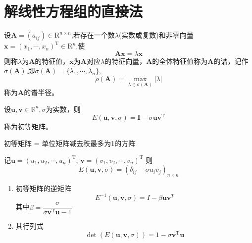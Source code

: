 \section{解线性方程组的直接法}
\begin{definition}[特征值和谱半径]
    设$\boldsymbol{A}=(a_{ij})\in \mathrm{R}^{n\times n}$,若存在一个数$\lambda$(实数或复数)和非零向量$\boldsymbol{x}=(x_1,\cdots,x_n)^{\mathrm{T}}\in \mathrm{R}^n$,使
    \[
        \boldsymbol{Ax}=\lambda \boldsymbol{x}
    \]
    则称$\lambda$为$\boldsymbol{A}$的特征值，$\boldsymbol{x}$为$\boldsymbol{A}$对应$\lambda$的特征向量，$\boldsymbol{A}$的全体特征值称为$\boldsymbol{A}$的谱，记作$\sigma(\boldsymbol{A})$,即$\sigma(\boldsymbol{A})=\{\lambda_1,\cdots,\lambda_n\}$,
    \[
        \rho(\boldsymbol{A})=\max_{\lambda\in\sigma(\boldsymbol{A})}|\lambda| 
    \]
    称为$\boldsymbol{A}$的谱半径。
\end{definition}
\begin{definition}
    设$\boldsymbol{u},\boldsymbol{v}\in\mathbb{R}^n,\sigma$为实数，则
    \[
        E(\boldsymbol{u},\boldsymbol{v},\sigma)=\boldsymbol{I}-\sigma\boldsymbol{u}\boldsymbol{v}^{\mathrm{T}}
    \]
    称为初等矩阵。

    \colorbox{cyan!50}{初等矩阵} = \colorbox{red!50}{单位矩阵}减去\colorbox{orange!50}{秩最多为1的方阵}
\end{definition}
\begin{note}
    记$\boldsymbol{u}= ( u_1, u_2, \cdots , u_n)^\mathrm{T}$, $\boldsymbol{v} = ( v_1, v_2, \cdots , v_n)^\mathrm{T}$
    则
    \[
        E(\boldsymbol{u},\boldsymbol{v},\sigma)=(\delta_{ij}-\sigma u_iv_j)_{n\times n}    
    \]

    \begin{enumerate}
        \item 初等矩阵的逆矩阵 
        \[
            E^{-1}(\boldsymbol{u},\boldsymbol{v},\sigma) = I- \beta \boldsymbol{u}\boldsymbol{v}^{T}
        \]
        其中$\beta = \dfrac{\sigma}{\sigma\boldsymbol{v}^{\mathrm{T}}\boldsymbol{u}-1}$
        \item 其行列式
        \[
            \operatorname{det}(E(\boldsymbol{u},\boldsymbol{v},\sigma))=1-\sigma \boldsymbol{v}^{\mathrm{T}}\boldsymbol{u}
        \]
    \end{enumerate}
\end{note}
